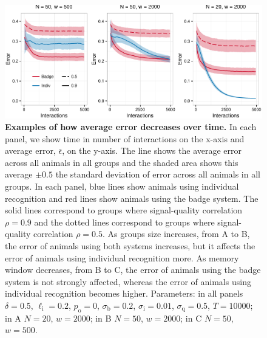 \begin{figure}

\includegraphics[width=.95\textwidth]{figures/learning_curves.pdf}
\caption{\label{learning_curves} \sffamily\small\textbf{Examples of how average error decreases over time.}
In each panel, we show time in number of interactions on the x-axis and average error, $\bar{\epsilon}$, on the y-axis. The line shows the average error across all animals in all groups and the shaded area shows this average $\pm 0.5$ the standard deviation of error across all animals in all groups. In each panel, blue lines show animals using individual recognition and red lines show animals using the badge system. The solid lines correspond to groups where signal-quality correlation $\rho=0.9$ and the dotted lines correspond to groups where signal-quality correlation $\rho=0.5$. As groups size increases, from A to B, the error of animals using both systems increases, but it affects the error of animals using individual recognition more. As memory window decreases, from B to C, the error of animals using the badge system is not strongly affected, whereas the error of animals using individual recognition becomes higher. Parameters: in all panels $\delta = 0.5$, $\ell_\text{i}=0.2$, $p_\text{o}=0$, $\sigma_\text{b}=0.2$, $\sigma_\text{i}=0.01$, $\sigma_\text{q}=0.5$, $T=10000$; in A $N=20$, $w=2000$; in B $N=50$, $w=2000$; in C $N=50$, $w=500$. }
\end{figure}

